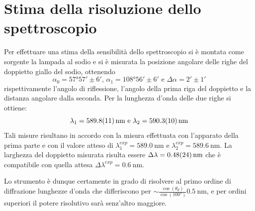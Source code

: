 \section{Stima della risoluzione dello spettroscopio}
	Per effettuare una stima della sensibilità dello
	spettroscopio si è montata come sorgente la 
	lampada al sodio e si è misurata la posizione angolare delle righe del doppietto giallo
	del sodio, ottenendo $$\alpha_0= \ang{57;57;} \pm 6'
	\text{, }\alpha_1=	\ang{108;56;}\pm 6' \text{ e } \Delta\alpha=2' \pm 1'$$
rispettivamente l'angolo di riflessione, l'angolo della prima riga del doppietto e la distanza angolare dalla seconda.
Per la lunghezza d'onda delle due righe si ottiene:
	$$\lambda_1= \SI{589.8 \pm 1.1}{\nano\meter}\text{ e } \lambda_2=  \SI{590.3 \pm 1.0}{\nano\meter}$$
	Tali misure risultano in accordo con 
	la misura effettuata con l'apparato della prima parte e con il valore atteso di $\lambda_1^{exp}= \SI{589.0}{\nano\meter}\text{ e } \lambda_2^{exp}=  \SI{589.6}{\nm}$.
		La larghezza del doppietto misurata risulta essere $\Delta 	\lambda=\SI{0.48 \pm 0.24}{\nano\meter}$ che è compatibile con quella attesa $\Delta 	\lambda^{exp}=\SI{0.6}{\nano\meter}$.

	Lo strumento è dunque certamente in grado di risolvere al primo ordine di diffrazione lunghezze d'onda che differiscono per $\sim \frac{    \cos (\theta_d)   }{   \cos (\ang{100})    }    \SI{0.5}{\nm} $, e per ordini superiori il potere risolutivo sarà senz'altro maggiore.